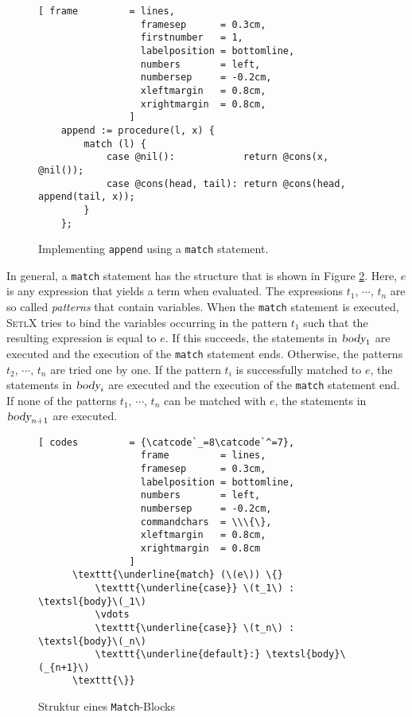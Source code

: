 \begin{figure}[!ht]
\centering
\begin{Verbatim}[ frame         = lines, 
                  framesep      = 0.3cm, 
                  firstnumber   = 1,
                  labelposition = bottomline,
                  numbers       = left,
                  numbersep     = -0.2cm,
                  xleftmargin   = 0.8cm,
                  xrightmargin  = 0.8cm,
                ]
    append := procedure(l, x) {
        match (l) {
            case @nil():            return @cons(x, @nil());
            case @cons(head, tail): return @cons(head, append(tail, x));
        }
    };
\end{Verbatim}
\vspace*{-0.3cm}
\caption{Implementing \texttt{append} using a \texttt{match} statement.}
\label{fig:append-match.stlx}
\end{figure}
In general, a \texttt{match} statement has the structure that is shown in Figure \ref{fig:match}.
Here, $e$ is any expression that yields a term when evaluated.  The expressions 
$t_1$, $\cdots$, $t_n$ are so called \emph{patterns} that contain variables.  When the \texttt{match} statement
is executed, \textsc{SetlX} tries to bind the variables occurring in the pattern $t_1$ such that the resulting
expression is equal to $e$.  If this succeeds, the statements in  $\textsl{body}_1$ are executed and the
execution of the \texttt{match} statement ends.
Otherwise, the patterns $t_2$, $\cdots$, $t_n$ are tried one by one.  If the pattern $t_i$ is successfully
matched to $e$, the statements in $\textsl{body}_i$ are executed and the execution of the \texttt{match}
statement end.  If none of the patterns $t_1$, $\cdots$, $t_n$ can be matched with $e$, the statements in
$\textsl{body}_{n+1}$ are executed.


\begin{figure}[!ht]
  \centering
\begin{Verbatim}[ codes         = {\catcode`_=8\catcode`^=7},
                  frame         = lines, 
                  framesep      = 0.3cm, 
                  labelposition = bottomline,
                  numbers       = left,
                  numbersep     = -0.2cm,
                  commandchars  = \\\{\},
                  xleftmargin   = 0.8cm,
                  xrightmargin  = 0.8cm
                ]
      \texttt{\underline{match} (\(e\)) \{}
          \texttt{\underline{case}} \(t_1\) : \textsl{body}\(_1\) 
          \vdots
          \texttt{\underline{case}} \(t_n\) : \textsl{body}\(_n\)
          \texttt{\underline{default}:} \textsl{body}\(_{n+1}\)
      \texttt{\}}
\end{Verbatim}
\vspace*{-0.3cm}
\caption{Struktur eines \texttt{Match}-Blocks}  \label{fig:match}
\end{figure} 


